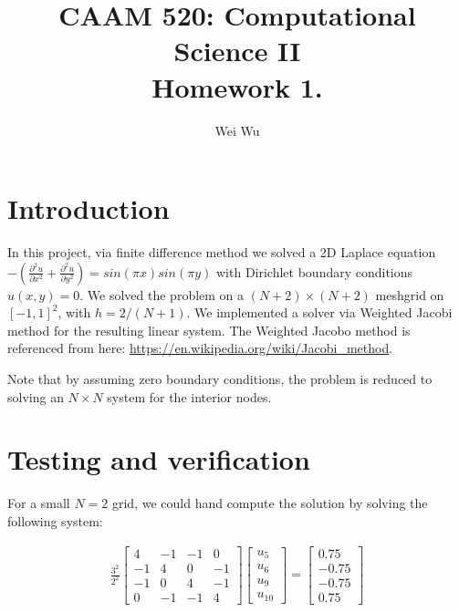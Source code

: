 \documentclass{amsart} %
\title{CAAM 520: Computational Science II \\
Homework 1.}
\author{Wei Wu}
\begin{document}

\maketitle

\section{Introduction} 
In this project, via finite difference method we solved a 2D Laplace equation $-(\frac{\partial^2 u}{\partial x^2} + \frac{\partial^2 u}{\partial y^2}) = sin(\pi x)sin(\pi y)$ with Dirichlet boundary conditions $u(x,y) = 0$. We solved the problem on a $(N + 2) \times (N + 2)$ meshgrid on $[-1,1]^2$, with $h = 2/(N+1)$. We implemented a solver via Weighted Jacobi method for the resulting linear system. The Weighted Jacobo method is referenced from here:  \url{https://en.wikipedia.org/wiki/Jacobi_method}. 

Note that by assuming zero boundary conditions, the problem is reduced to solving an $N \times N$ system for the interior nodes.   


\section{Testing and verification}
For a small $N = 2$ grid, we could hand compute the solution by solving the following system:

\begin{gather}
\frac{3^2}{2^2}
\begin{bmatrix} 4 & -1 & -1 & 0 \\ -1 & 4 & 0 & -1\\
				-1 & 0 & 4 & -1  \\ 0 & -1 & -1 & 4
 \end{bmatrix}
 \begin{bmatrix} u_5 \\ u_6 \\ u_9 \\ u_{10} \end{bmatrix}
=
\begin{bmatrix}
0.75 \\ -0.75 \\ -0.75 \\ 0.75
\end{bmatrix}
\end{gather}
\end{document}
